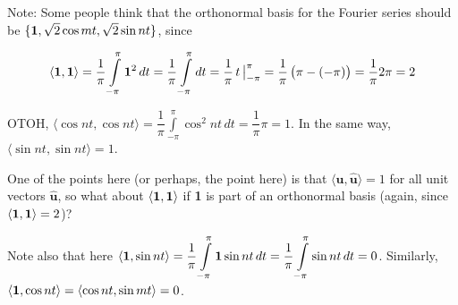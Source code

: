 \documentclass[11pt, oneside]{article}   	%
\begin{document}
 \bigskip
 \noindent
 Note: Some people think that the orthonormal basis for the Fourier 
 series should be $\{{\bf 1}, \sqrt{2} \cos mt,\sqrt{2} \sin nt\}$, 
 since 
 
 
 \begin{equation*}
   \langle {\bf 1},{\bf 1} \rangle = 
      \frac{1}{\pi}\int\limits_{-\pi}^{\pi} {\bf 1}^2 \, dt = 
      \frac{1}{\pi}\int\limits_{-\pi}^{\pi} dt              = 
      \frac{1}{\pi}  \, t \, \big |^{\pi}_{-\pi}            = 
      \frac{1}{\pi} \left (\pi - (-\pi) \right )            = 
      \frac{1}{\pi} 2\pi                                    = 
      2
 \end{equation*}
 
 \noindent
 OTOH, $\langle \cos nt, \cos nt \rangle = 
 {\displaystyle \dfrac{1}{\pi} \int\limits_{-\pi}^{\pi} \cos^2 nt \,dt = 
 \dfrac{1}{\pi} \pi = 1}$. In the same way,  $\langle \sin nt, \sin nt \rangle = 1$. 
 
 \medskip
 \noindent
 One of the points here (or perhaps, the point here) is that $\langle 
 \hat{\mathbf{u}},\hat{\mathbf{u}} \rangle = 1$ for all unit vectors $\hat{\mathbf{u}}$,
 so what about $\langle {\bf 1},{\bf 1} \rangle$ if {\bf 1} is part of an orthonormal basis
 (again, since $\langle {\bf 1},{\bf 1} \rangle = 2$)?
 
 
\medskip
\noindent
 Note also that here $\langle {\bf 1},\sin nt \rangle = {\displaystyle \dfrac{1}{\pi}\int\limits_{-\pi}^{\pi}
  {\bf 1} \sin nt \, dt} = {\displaystyle \dfrac{1}{\pi}\int\limits_{-\pi}^{\pi}
  \sin nt \, dt}  = 0$. Similarly, $\langle {\bf 1},\cos nt \rangle = \langle \cos nt,\sin mt \rangle = 0$. 

  
\vspace{2.0cm}
\end{document}
